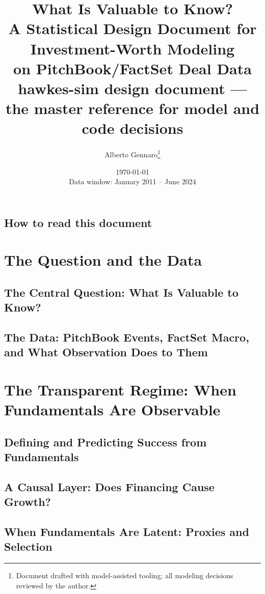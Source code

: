 \documentclass[11pt,a4paper,twoside,openany]{book}
\title{\Huge What Is Valuable to Know?\\[1ex]
\Large A Statistical Design Document for Investment-Worth Modeling\\
on PitchBook/FactSet Deal Data\\[2ex]
\normalsize hawkes-sim design document --- the master reference for model and code decisions}
\author{Alberto Gennaro\thanks{Document drafted with model-assisted tooling; all
modeling decisions reviewed by the author.}}
\date{\today\\[1ex]\normalsize Data window: January 2011 -- June 2024}
\theoremstyle{plain}
\theoremstyle{definition}
\theoremstyle{remark}
\begin{document}
\frontmatter
\maketitle

\chapter*{How to read this document}


\tableofcontents

\mainmatter

\part{The Question and the Data}
\chapter{The Central Question: What Is Valuable to Know?}\label{ch:question}


\chapter{The Data: PitchBook Events, FactSet Macro, and What Observation Does to Them}\label{ch:data}


\part{The Transparent Regime: When Fundamentals Are Observable}
\chapter{Defining and Predicting Success from Fundamentals}\label{ch:eufund}


\chapter{A Causal Layer: Does Financing Cause Growth?}\label{ch:eucausal}


\chapter{When Fundamentals Are Latent: Proxies and Selection}\label{ch:proxies}

\end{document}
